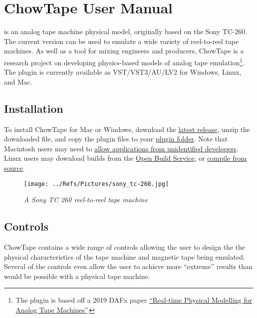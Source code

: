 \documentclass[landscape,twocolumn,a5paper]{manual}
\def\pluginfolder{\href{https://help.uaudio.com/hc/en-us/articles/210216306-Default-Install-Locations-for-UAD-Plug-Ins}{plugin folder}}
\def\dllink#1{\href{https://github.com/jatinchowdhury18/AnalogTapeModel/releases}{#1}}
\begin{document}
\section{ChowTape User Manual}

\noindent
{} is an analog tape machine physical model,
originally based on the Sony TC-260. The current version
can be used to emulate a wide variety of reel-to-reel tape
machines. As well as a tool for mixing engineers and producers,
ChowTape is a research project on developing physics-based
models of analog tape emulation\footnote{The plugin is based off a 2019 DAFx paper
\href{http://dafx2019.bcu.ac.uk/papers/DAFx2019_paper_3.pdf}{``Real-time Physical Modelling for Analog Tape Machines''}.}.
The plugin is currently available as VST/VST3/AU/LV2 for
Windows, Linux, and Mac.

\subsection{Installation}
To install ChowTape for Mac or Windows, download the
\dllink{latest release}, unzip the downloaded file, and copy
the plugin files to your \pluginfolder. Note that Macintosh
users may need to
\href{https://www.imore.com/how-open-apps-anywhere-macos-catalina-and-mojave}{allow applications from unidentified developers}.
Linux users may download builds from the
\href{https://build.opensuse.org/package/show/home:kill_it:JUCE/CHOWTapeModel}{Open Build Service}, or
\href{https://github.com/jatinchowdhury18/AnalogTapeModel/blob/master/BUILDING.md}{compile from source}.

\begin{figure}[ht]
    \center
    \texttt{[image: ../Refs/Pictures/sony\_tc-260.jpg]}
    \caption{\label{TapeMachine}{\it A Sony TC 260 reel-to-reel tape machine}}
\end{figure}


\subsection{Controls}
ChowTape contains a wide range of controls allowing the
user to design the the physical characteristics of the tape
machine and magnetic tape being emulated. Several of the
controls even allow the user to achieve more ``extreme''
results than would be possible with a physical tape machine.
\end{document}
